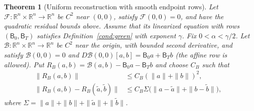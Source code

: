 \documentclass[twocolumn,nameyear,amsthm]{autart}
\newcommand{\R}{\mathbb R}
\newcommand{\B}{\mathcal B}
\newcommand{\Bzero}{\mathsf B_0}
\newcommand{\BT}{\mathsf B_T}
\numberwithin{equation}{section}
\newtheorem{theorem}{Theorem}[section]
\begin{document}
\begin{theorem}[Uniform reconstruction with smooth endpoint rows]
\label{thm:nonlinear-boundary}
Let $\mathcal F:\R^n\times\R^n\to\R^n$ be $C^2$ near $(0,0)$, satisfy
$\mathcal F(0,0)=0$, and have the quadratic residual bounds above.  Assume
that its linearized equation with rows
$(\Bzero,\BT)$ satisfies Definition~\ref{cond:green} with exponent $\gamma$.
Fix $0<\alpha<\gamma/2$.  Let $\B:\R^n\times\R^n\to\R^n$ be $C^2$ near the
origin, with bounded second derivative, and satisfy
$\B(0,0)=0$ and
$D\B(0,0)[a,b]=\Bzero a+\BT b$ (the affine row is allowed).  Put
$R_B(a,b)=\B(a,b)-\Bzero a-\BT b$ and choose $C_B$ such that
\begin{align}
 \|R_B(a,b)\|&\le C_B(\|a\|+\|b\|)^2,\label{eq:boundary-quadratic}\\
 \|R_B(a,b)-R_B(\tilde a,\tilde b)\|
 &\le C_B\Sigma\bigl(\|a-\tilde a\|+\|b-\tilde b\|\bigr),
 \label{eq:boundary-lipschitz}
\end{align}
where $\Sigma=\|a\|+\|b\|+\|\tilde a\|+\|\tilde b\|$.


\end{theorem}
\end{document}
